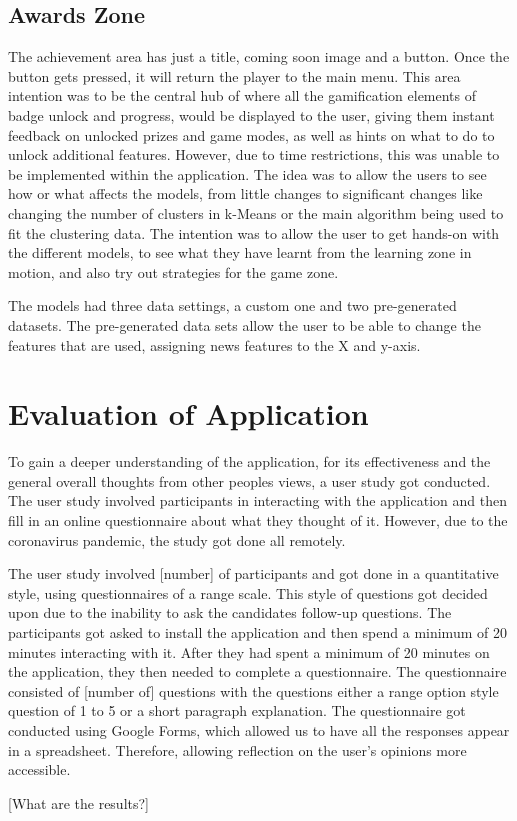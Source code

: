 	
	\subsection{Awards Zone}
	
	The achievement area has just a title, coming soon image and a button. Once the button gets pressed, it will return the player to the main menu. This area intention was to be the central hub of where all the gamification elements of badge unlock and progress, would be displayed to the user, giving them instant feedback on unlocked prizes and game modes,  as well as hints on what to do to unlock additional features. However, due to time restrictions, this was unable to be implemented within the application. The idea was to allow the users to see how or what affects the models, from little changes to significant changes like changing the number of clusters in k-Means or the main algorithm being used to fit the clustering data. The intention was to allow the user to get hands-on with the different models, to see what they have learnt from the learning zone in motion, and also try out strategies for the game zone. 
	
	The models had three data settings, a custom one and two pre-generated datasets. The pre-generated data sets allow the user to be able to change the features that are used, assigning news features to the X and y-axis.
	
			
	\section{Evaluation of Application}
		\label{sec:app_evaluation}
	
		To gain a deeper understanding of the application, for its effectiveness and the general overall thoughts from other peoples views, a user study got conducted. The user study involved participants in interacting with the application and then fill in an online questionnaire about what they thought of it. However, due to the coronavirus pandemic, the study got done all remotely.
		
		The user study involved [number] of participants and got done in a quantitative style, using questionnaires of a range scale. This style of questions got decided upon due to the inability to ask the candidates follow-up questions. The participants got asked to install the application and then spend a minimum of 20 minutes interacting with it. After they had spent a minimum of 20 minutes on the application, they then needed to complete a questionnaire. The questionnaire consisted of [number of] questions with the questions either a range option style question of 1 to 5 or a short paragraph explanation. The questionnaire got conducted using Google Forms, which allowed us to have all the responses appear in a spreadsheet. Therefore, allowing reflection on the user's opinions more accessible.
		
		[What are the results?]
		